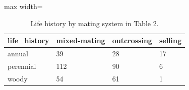 \begin{table}
\caption{Life history by mating system in Table 2.}
\label{tab:life_mating}
\begin{adjustbox}{max width=\textwidth}
\begin{tabular}{llll}
\toprule
life\_history & mixed-mating & outcrossing & selfing \\
\midrule
annual & 39 & 28 & 17 \\
perennial & 112 & 90 & 6 \\
woody & 54 & 61 & 1 \\
\bottomrule
\end{tabular}
\end{adjustbox}
\end{table}
